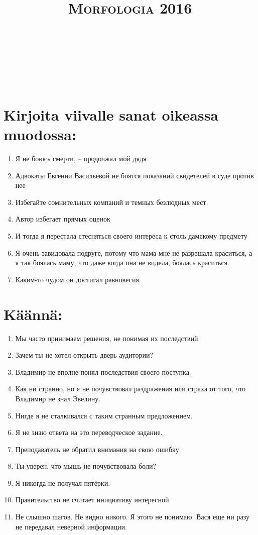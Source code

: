 \documentclass[paper=a4, fontsize=11pt]{scrartcl}
\title{	
\normalfont \normalsize 
\textsc{Morfologia 2016} \\ [25pt] 
\horrule{0.5pt} \\[0.4cm] 
\huge  \\ 
\horrule{2pt} \\[0.5cm] 
}
\date{}
\begin{document}
\onehalfspacing

\section{Kirjoita viivalle sanat oikeassa muodossa:}

\begin{enumerate}
    \item Я не боюсь смерти, -- продолжал мой дядя
    \item Адвокаты Евгении Васильевой не боятся показаний свидетелей в суде против нее
    \item Избегайте сомнительных компаний и темных безлюдных мест.
    \item Автор избегает прямых оценок
    \item И тогда я перестала стесняться своего интереса к столь дамскому предмету
    \item Я очень завидовала подруге, потому что мама мне не разрешала краситься, а я так боялась маму, что даже когда она не видела, боялась краситься.
    \item Каким-то чудом он достигал равновесия.
\end{enumerate}

\section{Käännä:}

\begin{enumerate}
    \item Мы часто принимаем решения, не понимая их последствий.
    \item Зачем ты не хотел открыть дверь аудитории? 
    \item Владимир не вполне понял последствия своего поступка. 
    \item Как ни странно, но я не почувствовал раздражения или страха от того, что Владимир не знал Эвелину.
    \item Нигде я не сталкивался с таким странным предложением. 
    \item Я не знаю ответа на это переводческое задание.
    \item Преподаватель не обратил внимания на свою ошибку.
    \item Ты уверен, что мышь не почувствовала боли? 
    \item Я никогда не получал пятёрки.
    \item Правительство не считает инициативу интересной.
    \item Не слышно шагов. Не видно никого. Я этого не понимаю. Вася еще ни разу не передавал неверной информации.
\end{enumerate}
\end{document}
